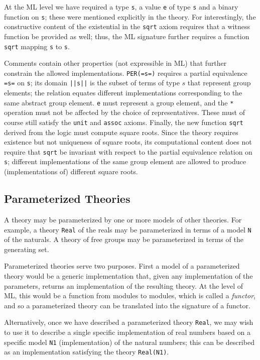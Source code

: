 At the ML level we have required a type \Verb|s|, a value \Verb|e| of
type \Verb|s| and a binary function on \Verb|s|;  these were mentioned explicitly in the theory.
For interestingly, the constructive content of the existential in the
\Verb|sqrt| axiom requires that a witness function be provided as
well; thus, the ML signature further requires a function \Verb|sqrt|
mapping \Verb|s| to \Verb|s|.

Comments contain other properties (not expressible in ML) that further
constrain the allowed implementations.  \Verb|PER(=s=)| requires a
partial equivalence \Verb|=s=| on \Verb|s|; its domain \Verb+||s||+ is the
subset of terms of type $s$ that represent group elements; the
relation equates different implementations corresponding to the same
abstract group element.  \Verb|e| must represent a
group element, and the \Verb|*| operation must not be affected by the
choice of representatives.  These must of course still satisfy the
\Verb|unit| and \Verb|assoc| axioms.  Finally, the new function
\Verb|sqrt| derived from the logic must compute square roots.  Since
the theory requires existence but not uniqueness of square roots, its
computational content does not require that \Verb|sqrt| be invariant
with respect to the partial equivalence relation on \Verb|s|;
different implementations of the same group element are allowed to produce
(implementations of) different square roots.


\subsection{Parameterized Theories}
\label{sec:param-theor-funct}

A theory may be parameterized by one or more models of other theories.
For example, a theory \Verb|Real| of the reals may be parameterized in
terms of a model \Verb|N| of the naturals.  A theory of free groups may be
parameterized in terms of the generating set.

Parameterized theories serve two purposes.  First a model of a
parameterized theory would be a generic implementation that, given any
implementation of the parameters, returns an implementation of the
resulting theory.  At the level of ML, this would be a function from
modules to modules, which is called a \emph{functor}, and so a
parameterized theory can be translated into the signature of a
functor.

Alternatively, once we have described a parameterized theory
\Verb|Real|, we may wish to use it to describe a single specific
implementation of real numbers based on a specific model \Verb|N1|
(implementation) of the natural numbers; this can be described as
an implementation satisfying the theory \Verb|Real(N1)|.

